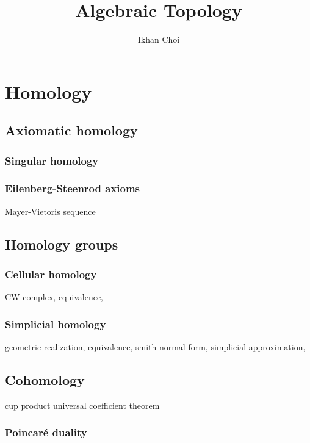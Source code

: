 \documentclass{../../large}
\begin{document}
\title{Algebraic Topology}
\author{Ikhan Choi}
\maketitle
\tableofcontents


\part{Homology}


\chapter{Axiomatic homology}

\section{Singular homology}

\section{Eilenberg-Steenrod axioms}
Mayer-Vietoris sequence




\chapter{Homology groups}

\section{Cellular homology}
CW complex,
equivalence,

\section{Simplicial homology}
geometric realization,
equivalence,
smith normal form,
simplicial approximation,




\chapter{Cohomology}

cup product
universal coefficient theorem


\section{Poincar\'e duality}
\end{document}
